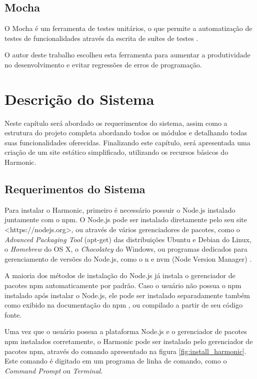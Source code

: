 \documentclass[ppginf, pep]{esinucpel}
\begin{document}
\section{Mocha}

O Mocha é um ferramenta de testes unitários, o que permite a automatização de testes de funcionalidades através da escrita de suítes de testes \cite{mocha}.

O autor deste trabalho escolheu esta ferramenta para aumentar a produtividade no desenvolvimento e evitar regressões de erros de programação.


\chapter{Descrição do Sistema}

Neste capítulo será abordado os requerimentos do sistema, assim como a estrutura do projeto completa abordando todos os módulos e detalhando todas suas funcionalidades oferecidas. Finalizando este capítulo, será apresentada uma criação de um site estático simplificado, utilizando os recursos básicos do Harmonic.

\section{Requerimentos do Sistema}

Para instalar o Harmonic, primeiro é necessário possuir o Node.js instalado juntamente com o npm. O Node.js pode ser instalado diretamente pelo seu site <https://nodejs.org>, ou através de vários gerenciadores de pacotes, como o \textit{Advanced Packaging Tool} (apt-get) das distribuições Ubuntu e Debian do Linux, o \textit{Homebrew} do OS X, o \textit{Chocolatey} do Windows, ou programas dedicados para gerenciamento de versões do Node.js, como o n \cite{n} e nvm (Node Version Manager) \cite{nvm}.

A maioria dos métodos de instalação do Node.js já instala o gerenciador de pacotes npm automaticamente por padrão. Caso o usuário não possua o npm instalado após instalar o Node.js, ele pode ser instalado separadamente também como exibido na documentação do npm \cite{npm_fancy_install}, ou compilado a partir de seu código fonte.

Uma vez que o usuário possua a plataforma Node.js e o gerenciador de pacotes npm instalados corretamente, o Harmonic pode ser instalado pelo gerenciador de pacotes npm, através do comando apresentado na figura \ref{fig:install_harmonic}. Este comando é digitado em um programa de linha de comando, como o \textit{Command Prompt} ou \textit{Terminal}.
\end{document}
